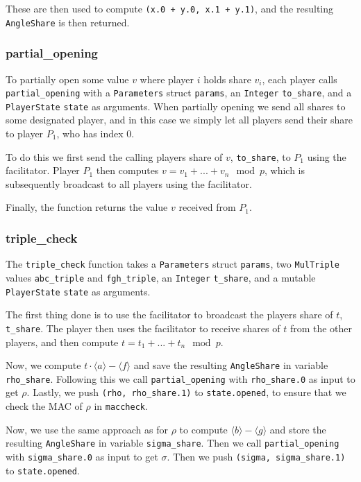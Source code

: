 \documentclass[../main.tex]{subfiles}
\begin{document}
These are then used to compute \lstinline{(x.0 + y.0, x.1 + y.1)}, and the resulting \lstinline{AngleShare} is then returned.
\subsubsection{partial\_opening}
To partially open some value $v$ where player $i$ holds share $v_i$, each player calls \lstinline{partial_opening} with a \lstinline{Parameters} struct \lstinline{params}, an \lstinline{Integer} \lstinline{to_share}, and a \lstinline{PlayerState}  \lstinline{state} as arguments. When partially opening we send all shares to some designated player, and in this case we simply let all players send their share to player $P_1$, who has index $0$.

To do this we first send the calling players share of $v$, \lstinline{to_share}, to $P_1$ using the facilitator. Player $P_1$ then computes $v = v_1 + ... + v_n \mod p$, which is subsequently broadcast to all players using the facilitator.

Finally, the function returns the value $v$ received from $P_1$.

\subsubsection{triple\_check}
The \lstinline{triple_check} function takes a \lstinline{Parameters} struct \lstinline{params}, two \lstinline{MulTriple} values \lstinline{abc_triple} and \lstinline{fgh_triple}, an \lstinline{Integer} \lstinline{t_share}, and a mutable \lstinline{PlayerState} \lstinline{state} as arguments.

The first thing done is to use the facilitator to broadcast the players share of $t$, \lstinline{t_share}. The player then uses the facilitator to receive shares of $t$ from the other players, and then compute $t = t_1 + ... + t_n \mod p$.

Now, we compute $t \cdot \langle a \rangle - \langle f \rangle$ and save the resulting \lstinline{AngleShare} in variable \lstinline{rho_share}. Following this we call \lstinline{partial_opening} with \lstinline{rho_share.0} as input to get $\rho$. Lastly, we push \lstinline{(rho, rho_share.1)} to \lstinline{state.opened}, to ensure that we check the MAC of $\rho$ in \lstinline{maccheck}.

Now, we use the same approach as for $\rho$ to compute $\langle b \rangle - \langle g \rangle$ and store the resulting \lstinline{AngleShare} in variable \lstinline{sigma_share}. Then we call \lstinline{partial_opening} with \lstinline{sigma_share.0} as input to get $\sigma$. Then we push \lstinline{(sigma, sigma_share.1)} to \lstinline{state.opened}.
\end{document}
